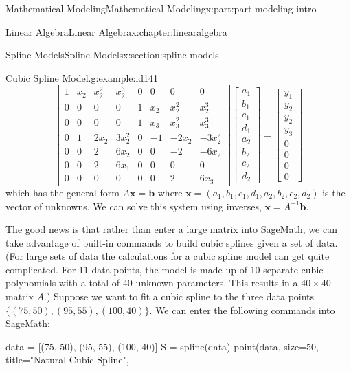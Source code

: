 \documentclass[oneside,10pt,]{book}
\numberwithin{equation}{section}
\newcommand{\amp}{&}
\begin{document}
\begin{partptx}{Mathematical Modeling}{}{Mathematical Modeling}{}{}{x:part:part-modeling-intro}
\begin{chapterptx}{Linear Algebra}{}{Linear Algebra}{}{}{x:chapter:linearalgebra}
\begin{sectionptx}{Spline Models}{}{Spline Models}{}{}{x:section:spline-models}
\begin{example}{Cubic Spline Model.}{g:example:id141}
\begin{equation*}
\begin{bmatrix}
1 \amp x_2 \amp x_2^2 \amp x_2^3 \amp 0 \amp 0 \amp 0 \amp 0 \\
0 \amp 0 \amp 0 \amp 0 \amp 1 \amp x_2 \amp x_2^2 \amp x_2^3 \\
0 \amp 0 \amp 0 \amp 0 \amp 1 \amp x_3 \amp x_3^2 \amp x_3^3 \\
0 \amp 1 \amp 2x_2 \amp 3x_2^2 \amp 0 \amp -1 \amp -2x_2 \amp -3x_2^2 \\
0 \amp 0 \amp 2 \amp 6x_2 \amp 0 \amp 0 \amp -2 \amp -6x_2 \\
0 \amp 0 \amp 2 \amp 6x_1 \amp 0 \amp 0 \amp 0 \amp 0 \\
0 \amp 0 \amp 0 \amp 0 \amp 0 \amp 0 \amp 2 \amp 6x_3	
\end{bmatrix}
\begin{bmatrix}
a_1 \\
b_1 \\
c_1 \\
d_1 \\
a_2 \\
b_2 \\
c_2 \\
d_2
\end{bmatrix} = \begin{bmatrix}
y_1 \\
y_2 \\
y_2 \\
y_3 \\
0 \\
0 \\
0 \\
0
\end{bmatrix}
\end{equation*}
which has the general form \(A\pmb{x}=\pmb{b}\) where \(\pmb{x}=(a_1, b_1, c_1, d_1, 
a_2, b_2, c_2, d_2)\) is the vector of unknowns. We can solve this system using inverses, \(\pmb{x}=A^{-1}\pmb{b}\).%
\par
The good news is that rather than enter a large matrix into SageMath, we can take advantage of built-in commands to build cubic splines given a set of data. (For large sets of data the calculations for a cubic spline model can get quite complicated. For 11 data points, the model is made up of 10 separate cubic polynomials with a total of 40 unknown parameters. This results in a \(40 \times 40\) matrix \(A\).)%
Suppose we want to fit a cubic spline to the three data points \(\{(75, 50), (95, 55), (100,40)\}\). We can enter the following commands into SageMath:%
\begin{sageinput}
data = [(75, 50), (95, 55), (100, 40)]
S = spline(data)
point(data, size=50, title="Natural Cubic Spline", 

\end{sageinput}
\end{example}
\end{sectionptx}
\end{chapterptx}
\end{partptx}
\end{document}
